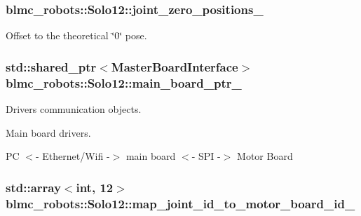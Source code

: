 \subsubsection[{\texorpdfstring{joint\+\_\+zero\+\_\+positions\+\_\+}{joint_zero_positions_}}]{ blmc\+\_\+robots\+::\+Solo12\+::joint\+\_\+zero\+\_\+positions\+\_\+\hspace{0.3cm}{\ttfamily [private]}}\hypertarget{classblmc__robots_1_1Solo12_ad3d4f55c1a8d5c16aaacf5e870370f18}{}\label{classblmc__robots_1_1Solo12_ad3d4f55c1a8d5c16aaacf5e870370f18}


Offset to the theoretical \char`\"{}0\char`\"{} pose. 

\subsubsection[{\texorpdfstring{main\+\_\+board\+\_\+ptr\+\_\+}{main_board_ptr_}}]{\setlength{\rightskip}{0pt plus 5cm}std\+::shared\+\_\+ptr$<$Master\+Board\+Interface$>$ blmc\+\_\+robots\+::\+Solo12\+::main\+\_\+board\+\_\+ptr\+\_\+\hspace{0.3cm}{\ttfamily [private]}}\hypertarget{classblmc__robots_1_1Solo12_a2675d6567258d0f02d387e228a6e85e1}{}\label{classblmc__robots_1_1Solo12_a2675d6567258d0f02d387e228a6e85e1}


Drivers communication objects. 

Main board drivers.

PC $<$-\/ Ethernet/\+Wifi -\/$>$ main board $<$-\/ S\+PI -\/$>$ Motor Board 
\subsubsection[{\texorpdfstring{map\+\_\+joint\+\_\+id\+\_\+to\+\_\+motor\+\_\+board\+\_\+id\+\_\+}{map_joint_id_to_motor_board_id_}}]{\setlength{\rightskip}{0pt plus 5cm}std\+::array$<$int, 12$>$ blmc\+\_\+robots\+::\+Solo12\+::map\+\_\+joint\+\_\+id\+\_\+to\+\_\+motor\+\_\+board\+\_\+id\+\_\+\hspace{0.3cm}{\ttfamily [private]}}\hypertarget{classblmc__robots_1_1Solo12_a783154ba0e9e7a931bc25a2ae17cea37}{}\label{classblmc__robots_1_1Solo12_a783154ba0e9e7a931bc25a2ae17cea37}


